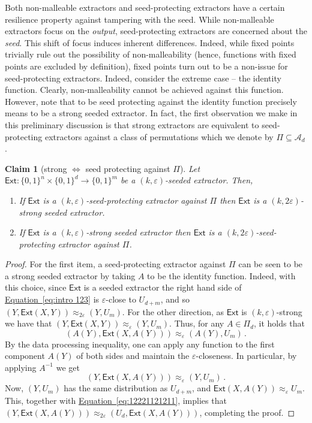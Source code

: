 \documentclass[11pt]{article}
\numberwithin{equation}{section}
\newtheorem{claim}[theorem]{Claim}
\theoremstyle{definition}
\theoremstyle{plain}
\newcommand{\expeqref}[2]{\hyperref[#2]{#1~\eqref{#2}}}
\newcommand{\ext}{\mathsf{Ext}}
\newcommand{\adv}{A}
\newcommand{\eps}{\varepsilon}
\newcommand{\perfam}{\Pi}
\begin{document}
Both non-malleable extractors and seed-protecting extractors have a certain resilience property against tampering %
with  %
the seed. While non-malleable extractors focus on the \emph{output}, seed-protecting extractors are concerned about the \emph{seed}. This shift of focus induces inherent differences. Indeed, while fixed points trivially rule out the possibility of non-malleability (hence, functions with fixed points are excluded by definition), fixed points turn out to be a non-issue for seed-protecting extractors.  Indeed, consider the extreme case -- the identity function. Clearly, non-malleability cannot be achieved against this function. However, note that to be seed protecting against the identity function precisely means to be a strong seeded extractor. In fact, the first observation we make in this preliminary discussion is that strong extractors are equivalent to seed-protecting extractors against
%
a class of permutations %
which we denote by $\perfam \subseteq \mathcal{A}_d$. %

%
\begin{claim}[strong $\iff$ seed protecting against $\perfam$]\label{c:intro strong sp}
Let $\ext \colon \{0,1\}^n \times \{0,1\}^d \to \{0,1\}^m$ be a $(k,\eps)$-seeded extractor. Then,
	\begin{enumerate}
		\item  If $\ext$ is a $(k,\eps)$-seed-protecting extractor against $\perfam$ then $\ext$ is a $(k,2\eps)$-strong seeded extractor.
		\item  If $\ext$ is a $(k,\eps)$-strong seeded extractor then $\ext$ is a $(k,2\eps)$-seed-protecting extractor against $\perfam$.
	\end{enumerate}
\end{claim}
\begin{proof}
  For the first item, a seed-protecting extractor against $\perfam$ can be seen to be a strong %
seeded extractor   %
by taking $\adv$ to be the identity function. Indeed, with this choice, since $\ext$ is
a 
%
seeded extractor   %
the right hand side of \expeqref{Equation}{eq:intro 123} is $\eps$-close to $U_{d+m}$, and so $(Y,\ext(X,Y)) \approx_{2\eps} (Y,U_m)$. 	For the other direction, as $\ext$ is $(k,\eps)$-strong we have that $(Y,\ext(X,Y)) \approx_\eps (Y,U_m)$. Thus, for any $\adv \in \perfam_d$, it holds that 
	$$(\adv(Y),\ext(X,\adv(Y))) \approx_\eps (\adv(Y),U_m)\,.$$
	By the data processing inequality, one can apply any function to the first component $\adv(Y)$ of both sides and maintain the $\eps$-closeness. In particular, by applying $\adv^{-1}$ we get 
	\begin{equation}\label{eq:12221121211}
	(Y,\ext(X,\adv(Y))) \approx_\eps (Y,U_m)\,.
	\end{equation}
	Now, $(Y,U_m)$ has the same distribution as $U_{d+m}$, and $\ext(X,\adv(Y)) \approx_\eps U_m$. This, together with \expeqref{Equation}{eq:12221121211}, implies that $(Y,\ext(X,\adv(Y))) \approx_{2\eps} (U_d,\ext(X,\adv(Y)))$, completing the proof.
\end{proof}
\end{document}

